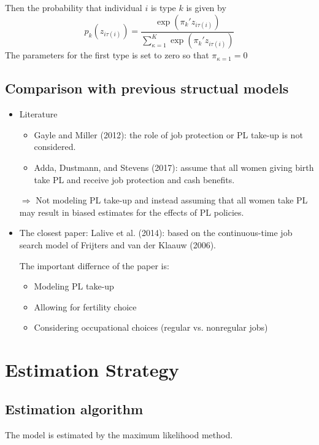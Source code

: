 \documentclass[../root]{subfiles}
\begin{document}
    Then the probability that individual $i$ is type $k$ is given by
    \[
    p_{k}(z_{i \tau (i)}) = \dfrac{\exp (\pi_k' z_{i \tau (i)})}{\sum_{\kappa = 1}^K \exp (\pi_k' z_{i \tau (i)})}
    \]
    The parameters for the first type is set to zero so that $\pi_{\kappa = 1} = 0$


    \subsection{Comparison with previous structual models}

    \begin{itemize}
      \item Literature
      \begin{itemize}
        \item Gayle and Miller (2012): the role of job protection or PL take-up is not considered.
        \item Adda, Dustmann, and Stevens (2017): assume that all women giving birth take PL and receive job protection and cash benefits.
      \end{itemize}
      $\Rightarrow$ Not modeling PL take-up and instead assuming that all women take PL may result in biased estimates for the effects of PL policies.
      \item The closest paper: Lalive et al. (2014): based on the continuous-time job search model of Frijters and van der Klaauw (2006).

      The important differnce of the paper is:
      \begin{itemize}
        \item Modeling PL take-up
        \item Allowing for fertility choice
        \item Considering occupational choices (regular vs. nonregular jobs)
      \end{itemize}
    \end{itemize}

    \section{Estimation Strategy}

    \subsection{Estimation algorithm}

    The model is estimated by the maximum likelihood method.
\end{document}
